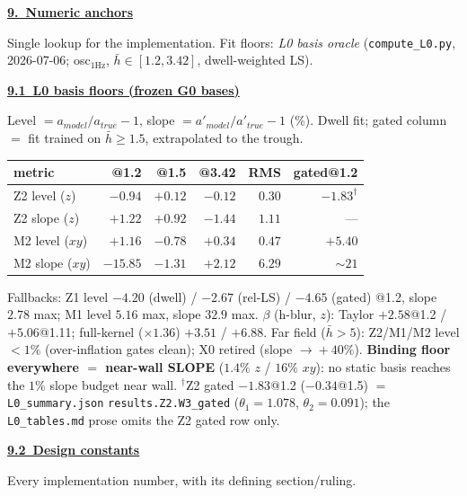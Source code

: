 \documentclass[11pt,a4paper,fontset=none]{ctexart}
\newcommand{\hd}[1]{\par\medskip\noindent\underline{\textbf{#1}}\par\nobreak\vspace{0.2ex}}
\begin{document}
\newpage
\hd{9.\ Numeric anchors}
Single lookup for the implementation. Fit floors: \emph{L0 basis oracle} (\texttt{compute\_L0.py}, 2026-07-06; osc$_{1\mathrm{Hz}}$, $\bar h\!\in\![1.2,3.42]$, dwell-weighted LS).

\hd{9.1\ L0 basis floors (frozen G0 bases)}
Level $=a_{model}/a_{true}-1$, slope $=a'_{model}/a'_{true}-1$ (\%). Dwell fit; gated column $=$ fit trained on $\bar h\!\ge\!1.5$, extrapolated to the trough.

\medskip
{\footnotesize\setlength{\tabcolsep}{6pt}
\begin{tabular}{@{}l r r r r r@{}}
\toprule
metric & @1.2 & @1.5 & @3.42 & RMS & gated@1.2 \\
\midrule
Z2 level ($z$) & $-0.94$ & $+0.12$ & $-0.12$ & $0.30$ & $-1.83^{\dagger}$ \\
Z2 slope ($z$) & $+1.22$ & $+0.92$ & $-1.44$ & $1.11$ & --- \\
M2 level ($xy$) & $+1.16$ & $-0.78$ & $+0.34$ & $0.47$ & $+5.40$ \\
M2 slope ($xy$) & $-15.85$ & $-1.31$ & $+2.12$ & $6.29$ & $\sim\!21$ \\
\bottomrule
\end{tabular}}

\smallskip
{\small Fallbacks: Z1 level $-4.20$ (dwell) / $-2.67$ (rel-LS) / $-4.65$ (gated) @1.2, slope $2.78$ max; M1 level $5.16$ max, slope $32.9$ max. $\beta$ (h-blur, $z$): Taylor $+2.58$@1.2 / $+5.06$@1.11; full-kernel ($\times1.36$) $+3.51$ / $+6.88$. Far field ($\bar h\!>\!5$): Z2/M1/M2 level $<\!1\%$ (over-inflation gates clean); X0 retired (slope $\to\!+40\%$). \textbf{Binding floor everywhere $=$ near-wall SLOPE} ($1.4\%$ $z$ / $16\%$ $xy$): no static basis reaches the $1\%$ slope budget near wall. $^{\dagger}$Z2 gated $-1.83$@1.2 ($-0.34$@1.5) $=$ \texttt{L0\_summary.json} \texttt{results.Z2.W3\_gated} ($\theta_1{=}1.078$, $\theta_2{=}0.091$); the \texttt{L0\_tables.md} prose omits the Z2 gated row only.}

\hd{9.2\ Design constants}
Every implementation number, with its defining section/ruling.
\medskip
\end{document}
